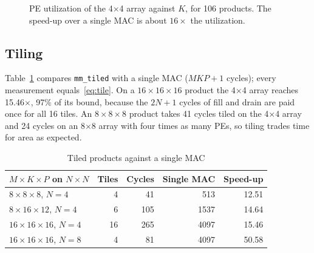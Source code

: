 \documentclass[conference]{IEEEtran}
\newcommand{\code}[1]{\texttt{#1}}
\begin{document}
\begin{figure}[t]
\centering
{}
\caption{PE utilization of the 4$\times$4 array against $K$, for 106 products. The speed-up over a single MAC is about $16\times$ the utilization.}
\label{fig:util}
\end{figure}

\subsection{Tiling}
Table~\ref{tab:tile} compares \code{mm\_tiled} with a single MAC ($MKP + 1$ cycles); every measurement equals~\eqref{eq:tile}. On a $16\times16\times16$ product the 4$\times$4 array reaches 15.46$\times$, 97\% of its bound, because the $2N + 1$ cycles of fill and drain are paid once for all 16 tiles. An $8\times8\times8$ product takes 41 cycles tiled on the 4$\times$4 array and 24 cycles on an 8$\times$8 array with four times as many PEs, so tiling trades time for area as expected.

\begin{table}[t]
\centering
\caption{Tiled products against a single MAC}
\label{tab:tile}
\begin{tabular}{lrrrr}
\toprule
$M{\times}K{\times}P$ on $N{\times}N$ & Tiles & Cycles & Single MAC & Speed-up \\
\midrule
$8{\times}8{\times}8$, $N{=}4$ & 4 & 41 & 513 & 12.51 \\
$8{\times}16{\times}12$, $N{=}4$ & 6 & 105 & 1537 & 14.64 \\
$16{\times}16{\times}16$, $N{=}4$ & 16 & 265 & 4097 & 15.46 \\
$16{\times}16{\times}16$, $N{=}8$ & 4 & 81 & 4097 & 50.58 \\
\bottomrule
\end{tabular}
\end{table}
\end{document}

